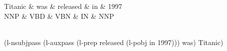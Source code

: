 \documentclass{article}
\begin{document}
\thispagestyle{empty}
\begin{center}
 \begin{dependency}[theme = default]
   \begin{deptext}[column sep=1em]
   Titanic \& was \& released \& in \& 1997 \\
   NNP \& VBD \& VBN \& IN \& NNP \\
   \end{deptext}
\end{dependency} \\
(l-nsubjpass (l-auxpass (l-prep released (l-pobj in 1997))) was) Titanic)
\end{center}
\end{document}
